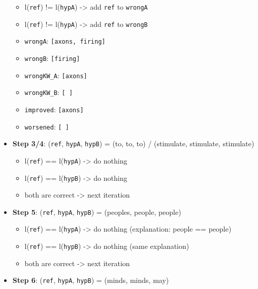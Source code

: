 \documentclass[]{article}
\providecommand{\tightlist}{%
  \setlength{\itemsep}{0pt}\setlength{\parskip}{0pt}}
\begin{document}
\begin{itemize}
  \begin{itemize}
  \tightlist
  \item
    l(\texttt{ref}) != l(\texttt{hypA}) -\textgreater{} add \texttt{ref}
    to \texttt{wrongA}
  \item
    l(\texttt{ref}) != l(\texttt{hypA}) -\textgreater{} add \texttt{ref}
    to \texttt{wrongB}
  \item
    \texttt{wrongA}: \texttt{{[}axons,\ firing{]}}
  \item
    \texttt{wrongB}: \texttt{{[}firing{]}}
  \item
    \texttt{wrongKW\_A}: \texttt{{[}axons{]}}
  \item
    \texttt{wrongKW\_B}: \texttt{{[}\ {]}}
  \item
    \texttt{improved}: \texttt{{[}axons{]}}
  \item
    \texttt{worsened}: \texttt{{[}\ {]}}
  \end{itemize}
\item
  \textbf{Step 3/4}: (\texttt{ref}, \texttt{hypA}, \texttt{hypB}) = (to,
  to, to) / (stimulate, stimulate, stimulate)

  \begin{itemize}
  \tightlist
  \item
    l(\texttt{ref}) == l(\texttt{hypA}) -\textgreater{} do nothing
  \item
    l(\texttt{ref}) == l(\texttt{hypB}) -\textgreater{} do nothing
  \item
    both are correct -\textgreater{} next iteration
  \end{itemize}
\item
  \textbf{Step 5}: (\texttt{ref}, \texttt{hypA}, \texttt{hypB}) =
  (peoples, people, people)

  \begin{itemize}
  \tightlist
  \item
    l(\texttt{ref}) == l(\texttt{hypA}) -\textgreater{} do nothing
    (explanation: people == people)
  \item
    l(\texttt{ref}) == l(\texttt{hypB}) -\textgreater{} do nothing (same
    explanation)
  \item
    both are correct -\textgreater{} next iteration
  \end{itemize}
\item
  \textbf{Step 6}: (\texttt{ref}, \texttt{hypA}, \texttt{hypB}) =
  (minds, minds, may)


\end{itemize}
\end{document}
